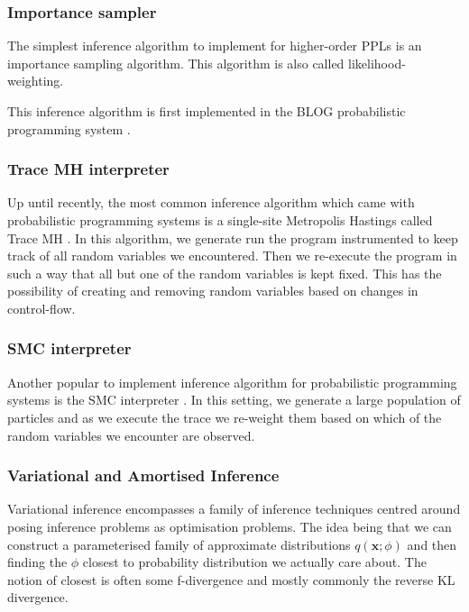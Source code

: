 \documentclass[12pt]{article}
\renewcommand{\vec}[1]{\boldsymbol{\mathbf{#1}}}
\theoremstyle{definition}
\begin{document}
\subsubsection{Importance sampler}

The simplest inference algorithm to implement for higher-order PPLs is
an importance sampling algorithm. This algorithm is also called likelihood-weighting.

This inference algorithm is first implemented in the BLOG
probabilistic programming system \citep{milchijcai2005}.

\subsubsection{Trace MH interpreter}

Up until recently, the most common inference algorithm which came with
probabilistic programming systems is a single-site Metropolis Hastings
called Trace MH
\citep{scibior2018functional,wingate2011lightweight}. In this
algorithm, we generate run the program instrumented to keep track of
all random variables we encountered.  Then we re-execute the program in
such a way that all but one of the random variables is kept fixed. This
has the possibility of creating and removing random variables based on
changes in control-flow.

\subsubsection{SMC interpreter}

Another popular to implement inference algorithm for probabilistic
programming systems is the SMC interpreter \citep{wood2014new}. In
this setting, we generate a large population of particles and as
we execute the trace we re-weight them based on which of the random
variables we encounter are observed.

\subsubsection{Variational and Amortised Inference}

Variational inference encompasses a family of inference techniques
centred around posing inference problems as optimisation problems. The
idea being that we can construct a parameterised family of approximate
distributions $q(\vec x; \phi)$ and then finding the $\phi$ closest to
probability distribution we actually care about. The notion of closest
is often some f-divergence and mostly commonly the reverse KL divergence.
\end{document}

